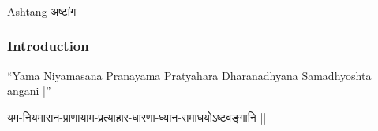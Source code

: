 \begin{frame}[fragile]\frametitle{}
\begin{center}
{\Large Ashtang अष्टांग }
\end{center}
\end{frame}


\begin{frame}[fragile]\frametitle{Introduction}
``Yama Niyamasana Pranayama Pratyahara Dharanadhyana Samadhyoshta angani |''

यम-नियमासन-प्राणायाम-प्रत्याहार-धारणा-ध्यान-समाधयोऽष्टवङ्गानि ||

\end{frame}


